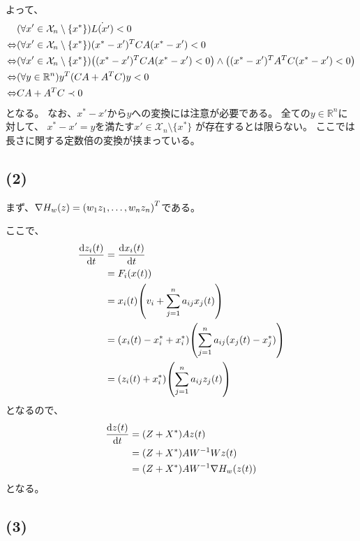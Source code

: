 \documentclass[a4paper, 10pt, dvipdfmx]{jlreq}
\begin{document}
よって、
\begin{align*}
                  & (\forall x'\in \mathcal{X}_n\setminus \{x^*\}) \dot{L(x')} < 0                                                      \\
  \Leftrightarrow & (\forall x'\in \mathcal{X}_n\setminus \{x^*\})(x^*-x')^TCA(x^*-x')<0                                                \\
  \Leftrightarrow & (\forall x'\in \mathcal{X}_n\setminus \{x^*\}) \qty((x^*-x')^TCA(x^*-x')< 0) \wedge \qty((x^*-x')^TA^TC(x^*-x')< 0) \\
  \Leftrightarrow & (\forall y \in \mathbb{R}^n) y^T(CA+A^TC)y< 0                                                                       \\
  \Leftrightarrow & CA+A^TC \prec 0
\end{align*}
となる。
なお、$x^*-x'$から$y$への変換には注意が必要である。
全ての$y\in \mathbb{R}^n$に対して、
$x^*-x'=y$を満たす$x'\in \mathcal{X}_n\setminus \{x^*\}$
が存在するとは限らない。
ここでは長さに関する定数倍の変換が挟まっている。

\subsection*{(2)}

まず、$\nabla H_w(z)= \qty(w_1z_1,\dots,w_nz_n)^T$である。

ここで、
\begin{align*}
  \dv{z_i(t)}{t} & =\dv{x_i(t)}{t}                                               \\
                 & =F_i(x(t))                                                    \\
                 & =x_i(t)\qty(v_i+\sum_{j=1}^{n}a_{ij}x_j(t))                   \\
                 & =(x_i(t)-x^*_i+x^*_i)\qty(\sum_{j=1}^{n}a_{ij}(x_j(t)-x^*_j)) \\
                 & =(z_i(t)+x^*_i)\qty(\sum_{j=1}^{n}a_{ij}z_j(t))
\end{align*}
となるので、
\begin{align*}
  \dv{z(t)}{t} & =(Z+X^*) A z(t)                    \\
               & =(Z+X^*) A W^{-1} W z(t)           \\
               & =(Z+X^*) A W^{-1} \nabla H_w(z(t))
\end{align*}
となる。

\subsection*{(3)}
\end{document}
